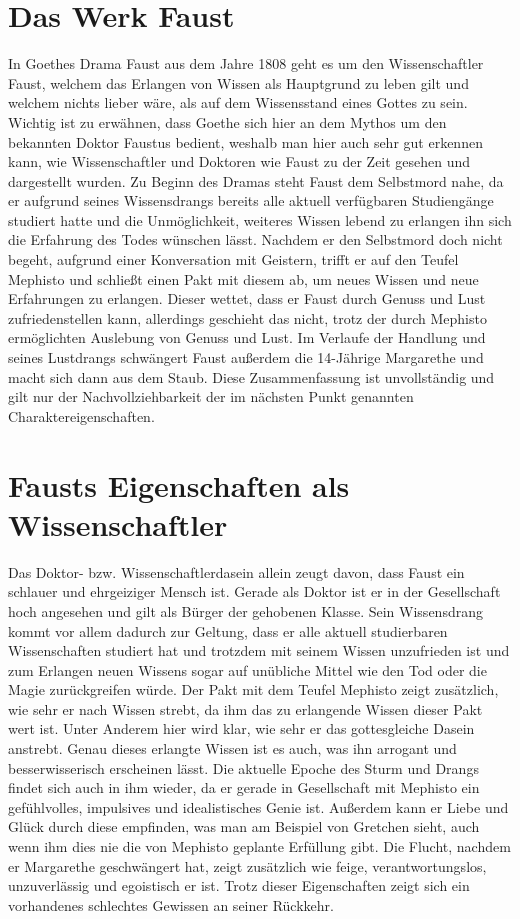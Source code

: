 \documentclass[12pt]{scrreprt}
\begin{document}
\section{Das Werk Faust}
	\label{sec:das werk faust}
In Goethes Drama Faust aus dem Jahre 1808 geht es um den Wissenschaftler Faust, welchem das Erlangen von Wissen als Hauptgrund zu leben gilt und welchem nichts lieber wäre, als auf dem Wissensstand eines Gottes zu sein.
Wichtig ist zu erwähnen, dass Goethe sich hier an dem Mythos um den bekannten Doktor Faustus bedient, weshalb man hier auch sehr gut erkennen kann, wie Wissenschaftler und Doktoren wie Faust zu der Zeit gesehen und dargestellt wurden.
Zu Beginn des Dramas steht Faust dem Selbstmord nahe, da er aufgrund seines Wissensdrangs bereits alle aktuell verfügbaren Studiengänge studiert hatte und die Unmöglichkeit, weiteres Wissen lebend zu erlangen ihn sich die Erfahrung des Todes wünschen lässt.
Nachdem er den Selbstmord doch nicht begeht, aufgrund einer Konversation mit Geistern, trifft er auf den Teufel Mephisto und schließt einen Pakt mit diesem ab, um neues Wissen und neue Erfahrungen zu erlangen.
Dieser wettet, dass er Faust durch Genuss und Lust zufriedenstellen kann, allerdings geschieht das nicht, trotz der durch Mephisto ermöglichten Auslebung von Genuss und Lust.
Im Verlaufe der Handlung und seines Lustdrangs schwängert Faust außerdem die 14-Jährige Margarethe und macht sich dann aus dem Staub.
Diese Zusammenfassung ist unvollständig und gilt nur der Nachvollziehbarkeit der im nächsten Punkt genannten Charaktereigenschaften.
\section{Fausts Eigenschaften als Wissenschaftler}
	\label{sec:fausts Eigenschaften}
Das Doktor- bzw. Wissenschaftlerdasein allein zeugt davon, dass Faust ein schlauer und ehrgeiziger Mensch ist.
Gerade als Doktor ist er in der Gesellschaft hoch angesehen und gilt als Bürger der gehobenen Klasse.
Sein Wissensdrang kommt vor allem dadurch zur Geltung, dass er alle aktuell studierbaren Wissenschaften studiert hat und trotzdem mit seinem Wissen unzufrieden ist und zum Erlangen neuen Wissens sogar auf unübliche Mittel wie den Tod oder die Magie zurückgreifen würde.
Der Pakt mit dem Teufel Mephisto zeigt zusätzlich, wie sehr er nach Wissen strebt, da ihm das zu erlangende Wissen dieser Pakt wert ist.
Unter Anderem hier wird klar, wie sehr er das gottesgleiche Dasein anstrebt.
Genau dieses erlangte Wissen ist es auch, was ihn arrogant und besserwisserisch erscheinen lässt.
Die aktuelle Epoche des Sturm und Drangs findet sich auch in ihm wieder, da er gerade in Gesellschaft mit Mephisto ein gefühlvolles, impulsives und idealistisches Genie ist.
Außerdem kann er Liebe und Glück durch diese empfinden, was man am Beispiel von Gretchen sieht, auch wenn ihm dies nie die von Mephisto geplante Erfüllung gibt.
Die Flucht, nachdem er Margarethe geschwängert hat, zeigt zusätzlich wie feige, verantwortungslos, unzuverlässig und egoistisch er ist.
Trotz dieser Eigenschaften zeigt sich ein vorhandenes schlechtes Gewissen an seiner Rückkehr.
\autocite{wiki:Faust_Studyflix}
\autocite{wiki:Faust_Studysmarter}
\end{document}
